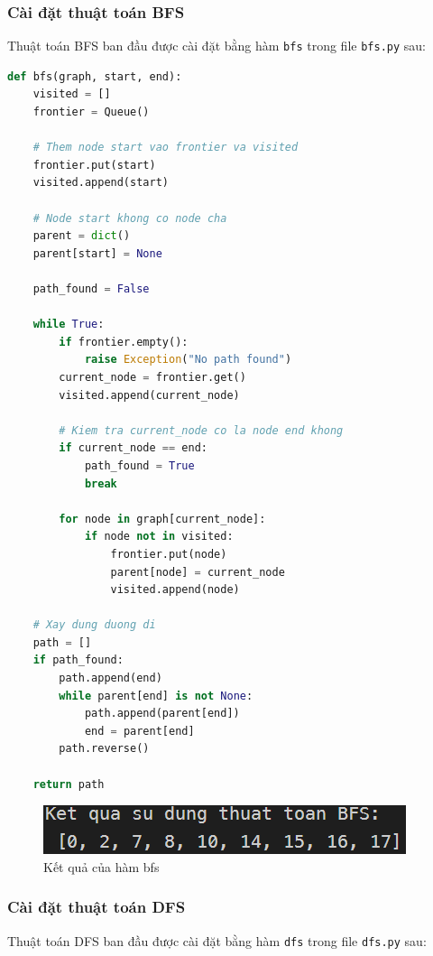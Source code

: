\documentclass[a4paper, 11pt]{article}
\begin{document}
\subsubsection{Cài đặt thuật toán BFS}

Thuật toán BFS ban đầu được cài đặt bằng hàm \lstinline{bfs} trong file \lstinline{bfs.py} sau:

\begin{lstlisting}[language=Python]
def bfs(graph, start, end):
    visited = []
    frontier = Queue()

    # Them node start vao frontier va visited
    frontier.put(start)
    visited.append(start)

    # Node start khong co node cha
    parent = dict()
    parent[start] = None

    path_found = False

    while True:
        if frontier.empty():
            raise Exception("No path found")
        current_node = frontier.get()
        visited.append(current_node)

        # Kiem tra current_node co la node end khong
        if current_node == end:
            path_found = True
            break

        for node in graph[current_node]:
            if node not in visited:
                frontier.put(node)
                parent[node] = current_node
                visited.append(node)

    # Xay dung duong di
    path = []
    if path_found:
        path.append(end)
        while parent[end] is not None:
            path.append(parent[end])
            end = parent[end]
        path.reverse()
        
    return path
\end{lstlisting}

\begin{figure}[h]
    \centering
    \includegraphics[]{bfs_func.png}
    \caption{Kết quả của hàm bfs}
\end{figure}

\subsubsection{Cài đặt thuật toán DFS}
Thuật toán DFS ban đầu được cài đặt bằng hàm \lstinline{dfs} trong file \lstinline{dfs.py} sau:
\end{document}
